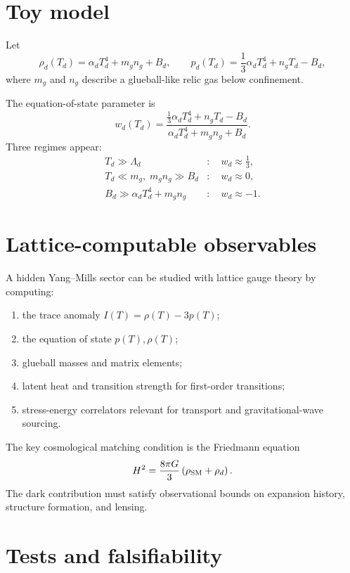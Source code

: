 \documentclass[11pt]{article}
\theoremstyle{remark}
\begin{document}
\section{Toy model}

Let
\begin{equation}
\rho_d(T_d)=\alpha_d T_d^4 + m_g n_g + B_d,
\qquad
p_d(T_d)=\frac13\alpha_d T_d^4 + n_g T_d - B_d,
\end{equation}
where $m_g$ and $n_g$ describe a glueball-like relic gas below confinement.

The equation-of-state parameter is
\begin{equation}
w_d(T_d)=\frac{\frac13\alpha_dT_d^4+n_gT_d-B_d}{\alpha_dT_d^4+m_gn_g+B_d}.
\end{equation}
Three regimes appear:
\begin{align}
T_d\gg\Lambda_d &: \quad w_d\approx\frac13,\\
T_d\ll m_g,\;m_gn_g\gg B_d &: \quad w_d\approx0,\\
B_d\gg \alpha_dT_d^4+m_gn_g &: \quad w_d\approx-1.
\end{align}

\section{Lattice-computable observables}

A hidden Yang--Mills sector can be studied with lattice gauge theory by computing:
\begin{enumerate}[label=(\alph*)]
\item the trace anomaly $I(T)=\rho(T)-3p(T)$;
\item the equation of state $p(T),\rho(T)$;
\item glueball masses and matrix elements;
\item latent heat and transition strength for first-order transitions;
\item stress-energy correlators relevant for transport and gravitational-wave sourcing.
\end{enumerate}

The key cosmological matching condition is the Friedmann equation
\begin{equation}
H^2=\frac{8\pi G}{3}\left(\rho_{\rm SM}+\rho_d\right).
\end{equation}
The dark contribution must satisfy observational bounds on expansion history, structure formation, and lensing.

\section{Tests and falsifiability}
\end{document}
